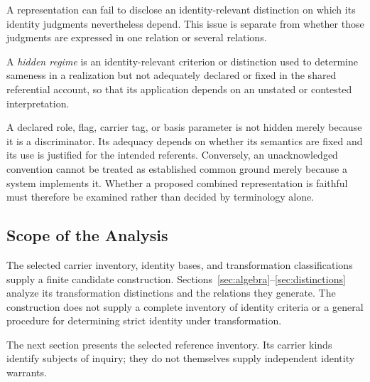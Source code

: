 A representation can fail to disclose an identity-relevant distinction
on which its identity judgments nevertheless depend.
This issue is
separate from whether those judgments are expressed in one relation
or several relations.

\begin{definition}
  \label{se200.def.HiddenRegime}
  A \emph{hidden regime} is an identity-relevant criterion or distinction
  used to determine sameness in a realization but not adequately
  declared or fixed in the shared referential account, so that its
  application depends on an unstated or contested interpretation.
\end{definition}

A declared role, flag, carrier tag, or basis parameter is not hidden
merely because it is a discriminator.
Its adequacy depends on whether
its semantics are fixed and its use is justified for the intended
referents.
Conversely, an unacknowledged convention cannot be treated
as established common ground merely because a system implements it.
Whether a proposed combined representation is faithful must therefore
be examined rather than decided by terminology alone.

\subsection{Scope of the Analysis}
\label{subsec:scope_of_analysis}

The selected carrier inventory, identity bases, and transformation
classifications supply a finite candidate construction.
Sections~\ref{sec:algebra}--\ref{sec:distinctions} analyze its
transformation distinctions and the relations they generate.
The construction does not supply a complete inventory of identity
criteria or a general procedure for determining strict identity
under transformation.

The next section presents the selected reference inventory.
Its carrier
kinds identify subjects of inquiry; they do not themselves supply
independent identity warrants.
